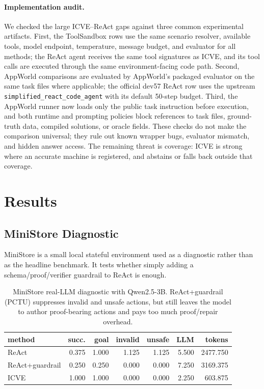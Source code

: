 \documentclass[11pt]{article}
\newcommand{\icve}{ICVE\xspace}
\begin{document}
\paragraph{Implementation audit.}
We checked the large ICVE--ReAct gaps against three common experimental artifacts. First,
the ToolSandbox rows use the same scenario resolver, available tools, model endpoint,
temperature, message budget, and evaluator for all methods; the ReAct agent receives the
same tool signatures as ICVE, and its tool calls are executed through the same
environment-facing code path. Second, AppWorld comparisons are evaluated by AppWorld's
packaged evaluator on the same task files where applicable; the official dev57 ReAct row
uses the upstream \texttt{simplified\_react\_code\_agent} with its default 50-step
budget. Third, the AppWorld runner now loads only the public task instruction before
execution, and both runtime and prompting policies block references to task files,
ground-truth data, compiled solutions, or oracle fields. These checks do not make the
comparison universal; they rule out known wrapper bugs, evaluator mismatch, and hidden
answer access. The remaining threat is coverage: ICVE is strong where an accurate machine
is registered, and abstains or falls back outside that coverage.

\section{Results}

\subsection{MiniStore Diagnostic}

MiniStore is a small local stateful environment used as a diagnostic rather than as the
headline benchmark. It tests whether simply adding a schema/proof/verifier guardrail to
ReAct is enough.

\begin{table}[h]
\centering
\scriptsize
\setlength{\tabcolsep}{3pt}
\begin{tabular}{lrrrrrr}
\hline
method & succ. & goal & invalid & unsafe & LLM & tokens \\
\hline
ReAct & 0.375 & 1.000 & 1.125 & 1.125 & 5.500 & 2477.750 \\
ReAct+guardrail & 0.250 & 0.250 & 0.000 & 0.000 & 7.250 & 3169.375 \\
\icve & 1.000 & 1.000 & 0.000 & 0.000 & 2.250 & 603.875 \\
\hline
\end{tabular}
\caption{MiniStore real-LLM diagnostic with Qwen2.5-3B. ReAct+guardrail (PCTU)
suppresses invalid and unsafe actions, but still leaves the model to author proof-bearing
actions and pays too much proof/repair overhead.}
\label{tab:ministore}
\end{table}
\end{document}
